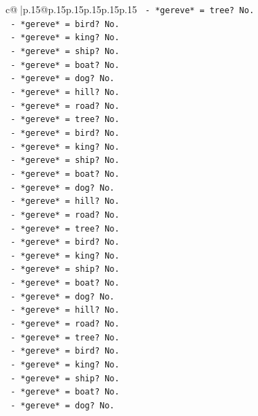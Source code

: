 \documentclass{article}
\begin{document}
{\begin{supertabular}{c@{$\;$}|p{.15\linewidth}@{}p{.15\linewidth}p{.15\linewidth}p{.15\linewidth}p{.15\linewidth}p{.15\linewidth}}
{{{\texttt{            {-} *gereve* = tree? No.} \\
\texttt{            {-} *gereve* = bird? No.} \\
\texttt{            {-} *gereve* = king? No.} \\
\texttt{            {-} *gereve* = ship? No.} \\
\texttt{            {-} *gereve* = boat? No.} \\
\texttt{            {-} *gereve* = dog? No.} \\
\texttt{            {-} *gereve* = hill? No.} \\
\texttt{            {-} *gereve* = road? No.} \\
\texttt{            {-} *gereve* = tree? No.} \\
\texttt{            {-} *gereve* = bird? No.} \\
\texttt{            {-} *gereve* = king? No.} \\
\texttt{            {-} *gereve* = ship? No.} \\
\texttt{            {-} *gereve* = boat? No.} \\
\texttt{            {-} *gereve* = dog? No.} \\
\texttt{            {-} *gereve* = hill? No.} \\
\texttt{            {-} *gereve* = road? No.} \\
\texttt{            {-} *gereve* = tree? No.} \\
\texttt{            {-} *gereve* = bird? No.} \\
\texttt{            {-} *gereve* = king? No.} \\
\texttt{            {-} *gereve* = ship? No.} \\
\texttt{            {-} *gereve* = boat? No.} \\
\texttt{            {-} *gereve* = dog? No.} \\
\texttt{            {-} *gereve* = hill? No.} \\
\texttt{            {-} *gereve* = road? No.} \\
\texttt{            {-} *gereve* = tree? No.} \\
\texttt{            {-} *gereve* = bird? No.} \\
\texttt{            {-} *gereve* = king? No.} \\
\texttt{            {-} *gereve* = ship? No.} \\
\texttt{            {-} *gereve* = boat? No.} \\
\texttt{            {-} *gereve* = dog? No.} \\
}}}
\end{supertabular}}
\end{document}
